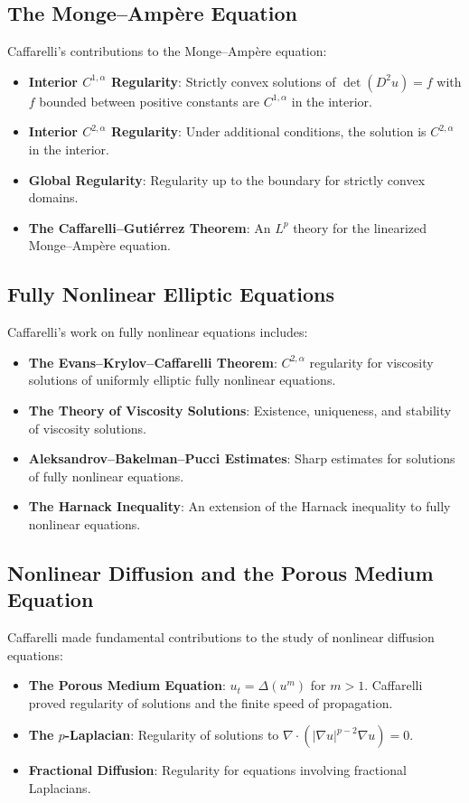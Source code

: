 \subsection{The Monge--Amp\`ere Equation}

Caffarelli's contributions to the Monge--Amp\`ere equation:
\begin{itemize}
\item \textbf{Interior $C^{1,\alpha}$ Regularity}: Strictly convex solutions of $\det(D^2 u) = f$ with $f$ bounded between positive constants are $C^{1,\alpha}$ in the interior.
\item \textbf{Interior $C^{2,\alpha}$ Regularity}: Under additional conditions, the solution is $C^{2,\alpha}$ in the interior.
\item \textbf{Global Regularity}: Regularity up to the boundary for strictly convex domains.
\item \textbf{The Caffarelli--Guti\'errez Theorem}: An $L^p$ theory for the linearized Monge--Amp\`ere equation.
\end{itemize}

\subsection{Fully Nonlinear Elliptic Equations}

Caffarelli's work on fully nonlinear equations includes:
\begin{itemize}
\item \textbf{The Evans--Krylov--Caffarelli Theorem}: $C^{2,\alpha}$ regularity for viscosity solutions of uniformly elliptic fully nonlinear equations.
\item \textbf{The Theory of Viscosity Solutions}: Existence, uniqueness, and stability of viscosity solutions.
\item \textbf{Aleksandrov--Bakelman--Pucci Estimates}: Sharp estimates for solutions of fully nonlinear equations.
\item \textbf{The Harnack Inequality}: An extension of the Harnack inequality to fully nonlinear equations.
\end{itemize}

\subsection{Nonlinear Diffusion and the Porous Medium Equation}

Caffarelli made fundamental contributions to the study of nonlinear diffusion equations:
\begin{itemize}
\item \textbf{The Porous Medium Equation}: $u_t = \Delta(u^m)$ for $m > 1$. Caffarelli proved regularity of solutions and the finite speed of propagation.
\item \textbf{The $p$-Laplacian}: Regularity of solutions to $\nabla \cdot (|\nabla u|^{p-2} \nabla u) = 0$.
\item \textbf{Fractional Diffusion}: Regularity for equations involving fractional Laplacians.
\end{itemize}

